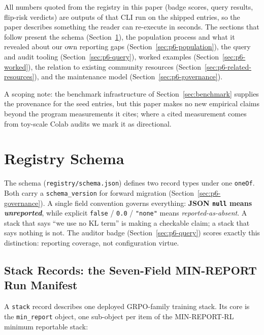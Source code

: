 \documentclass{article}
\providecommand{\secref}[1]{Section~\ref{#1}}
\begin{document}
All numbers quoted from the registry in this paper (badge scores, query
results, flip-risk verdicts) are outputs of that CLI run on the shipped
entries, so the paper describes something the reader can re-execute in
seconds. The sections that follow present the schema
(Section~\ref{sec:p6-schema}), the population process and what it revealed
about our own reporting gaps (Section~\ref{sec:p6-population}), the query and
audit tooling (Section~\ref{sec:p6-query}), worked examples
(Section~\ref{sec:p6-worked}), the relation to existing community resources
(Section~\ref{sec:p6-related-resources}), and the maintenance model
(Section~\ref{sec:p6-governance}).

A scoping note: the benchmark infrastructure of \secref{sec:benchmark} supplies
the provenance for the seed entries, but this paper makes no new empirical
claims beyond the program measurements it cites; where a cited measurement
comes from toy-scale Colab audits we mark it as directional.
 \section{Registry Schema}
\label{sec:p6-schema}

The schema (\texttt{registry/schema.json}) defines two record types under one
\texttt{oneOf}. Both carry a \texttt{schema_version} for forward migration
(Section~\ref{sec:p6-governance}). A single field convention governs
everything: \textbf{JSON \texttt{null} means \emph{unreported}}, while explicit
\texttt{false} / \texttt{0.0} / \texttt{"none"} means
\emph{reported-as-absent}. A stack that says ``we use no KL term'' is making a
checkable claim; a stack that says nothing is not. The auditor badge
(Section~\ref{sec:p6-query}) scores exactly this distinction: reporting
coverage, not configuration virtue.

\subsection{Stack Records: the Seven-Field MIN-REPORT Run Manifest}
\label{sec:p6-schema-stack}
A \texttt{stack} record describes one deployed GRPO-family training stack. Its
core is the \texttt{min_report} object, one sub-object per item of the
MIN-REPORT-RL minimum reportable stack:
\end{document}
